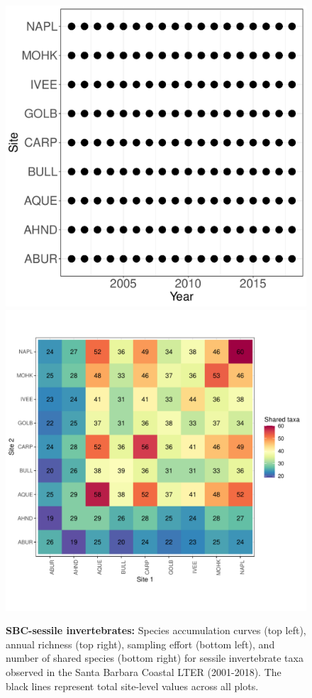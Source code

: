 \documentclass[11pt, oneside]{article}
\begin{document}
\begin{figure}[h!]
\includegraphics[scale = 0.4]{sbc-sessileInverts-castorani_spatiotemporal_sampling_effort.pdf}
\includegraphics[scale = 0.4]{sbc-sessileInverts-castorani_spp_shared.pdf}
\caption{{\bf SBC-sessile invertebrates:} Species accumulation curves (top left),  annual richness (top right), sampling effort (bottom left), and number of shared species (bottom right)  for sessile invertebrate taxa observed in the Santa Barbara Coastal LTER (2001-2018). The black lines represent total site-level values across all plots.}
\label{sbc-sessileInverts}
\end{figure}
\end{document}
